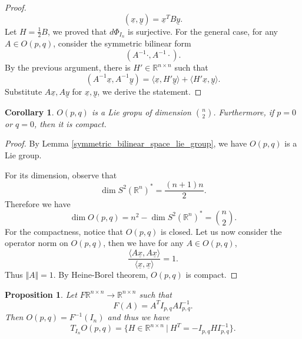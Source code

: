 \documentclass{article}
\newtheorem{proposition}{Proposition}[section]
\newtheorem{corollary}{Corollary}[section]
\numberwithin{equation}{section}
\begin{document}
\begin{proof}
\begin{equation*}
(\underline{x},\underline{y}) = \underline{x}^TB\underline{y}.
\end{equation*}
Let $H= {\frac 1 2}B$, we proved that $d\Phi_{I_n}$ is surjective. For the general case, for any $A\in O(p,q)$, consider the symmetric bilinear form
\begin{equation*}
(A^{-1}\cdot,A^{-1}\cdot).
\end{equation*}
By the previous argument, there is $H'\in\mathbb{R}^{n\times n}$ such that 
\begin{equation*}
(A^{-1}\underline{x},A^{-1}\underline{y}) = \langle\underline{x},H'\underline{y}\rangle+\langle H'\underline{x},\underline{y}\rangle.
\end{equation*}
Substitute $A\underline{x},A\underline{y}$ for $\underline{x},\underline{y}$, we derive the statement.
\end{proof}

\begin{corollary}
$O(p,q)$ is a Lie gropu of dimension ${n \choose 2}$. Furthermore, if $p=0$ or $q=0$, then it is compact. 
\end{corollary}

\begin{proof}
By Lemma \ref{symmetric_bilinear_space_lie_group}, we have $O(p,q)$ is a Lie group. \\
\par For its dimension, observe that 
\begin{equation*}
\dim S^2(\mathbb{R}^n)^* = {\frac {(n+1)n} 2}.
\end{equation*}
Therefore we have
\begin{equation*}
\dim O(p,q) = n^2 -\dim S^2(\mathbb{R}^n)^* = {n\choose 2}.
\end{equation*}
For the compactness, notice that $O(p,q)$ is closed. Let us now consider the operator norm on $O(p,q)$, then we have for any $A\in O(p,q)$,
\begin{equation*}
{\frac {\langle A\underline{x},A\underline{x}\rangle} {\langle\underline{x},\underline{x}\rangle}} = 1.
\end{equation*}
Thus $\Vert A\Vert = 1$. By Heine-Borel theorem, $O(p,q)$ is compact.
\end{proof}

\begin{proposition}
Let $F\mathbb{R}^{n\times n}\to \mathbb{R}^{n\times n}$ such that 
\begin{equation*}
F(A) = A^TI_{p,q}AI_{p,q}^{-1}.
\end{equation*}
Then $O(p,q) = F^{-1}(I_n)$ and thus we have
\begin{equation*}
T_{I_n}O(p,q) = \{ H\in\mathbb{R}^{n\times n}\:|\: H^T=-I_{p,q}HI_{p,q}^{-1}\}.
\end{equation*}
\end{proposition}
\end{document}
